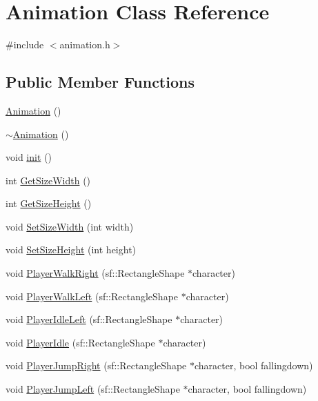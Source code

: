 \hypertarget{classAnimation}{}\section{Animation Class Reference}
\label{classAnimation}


{\ttfamily \#include $<$animation.\+h$>$}

\subsection*{Public Member Functions}
\begin{DoxyCompactItemize}
\item 
\hyperlink{classAnimation_a83f0a16cef7117f187ad596de38dd9d6}{Animation} ()
\item 
\hyperlink{classAnimation_a401b68793d4fbf48d481c030ee4b2a16}{$\sim$\+Animation} ()
\item 
void \hyperlink{classAnimation_a71cd77a66064b85cb34061b47c414709}{init} ()
\item 
int \hyperlink{classAnimation_a17d7d2d6b964bd376eecd11526ec713e}{Get\+Size\+Width} ()
\item 
int \hyperlink{classAnimation_a7c267306f82cc1ea24efb7eeb837a7c7}{Get\+Size\+Height} ()
\item 
void \hyperlink{classAnimation_ab52da84939f7cea63e8c3926abefa595}{Set\+Size\+Width} (int width)
\item 
void \hyperlink{classAnimation_aa25c884e5931c4afa2238480e83c9df4}{Set\+Size\+Height} (int height)
\item 
void \hyperlink{classAnimation_a21c41b29f392f2f0badaae5c7444ae40}{Player\+Walk\+Right} (sf\+::\+Rectangle\+Shape $\ast$character)
\item 
void \hyperlink{classAnimation_ada6222ad6014e0c7582ad27f05e26461}{Player\+Walk\+Left} (sf\+::\+Rectangle\+Shape $\ast$character)
\item 
void \hyperlink{classAnimation_a508a78a4830ace728dc529f96fa43813}{Player\+Idle\+Left} (sf\+::\+Rectangle\+Shape $\ast$character)
\item 
void \hyperlink{classAnimation_a83f5edfffa3d2349f71e1bb7d81395c3}{Player\+Idle} (sf\+::\+Rectangle\+Shape $\ast$character)
\item 
void \hyperlink{classAnimation_ab7f9df65827e2d2b4bb75f908189f716}{Player\+Jump\+Right} (sf\+::\+Rectangle\+Shape $\ast$character, bool fallingdown)
\item 
void \hyperlink{classAnimation_a0469ce861da8662b3abb2f05fb7ce509}{Player\+Jump\+Left} (sf\+::\+Rectangle\+Shape $\ast$character, bool fallingdown)

\end{DoxyCompactItemize}
